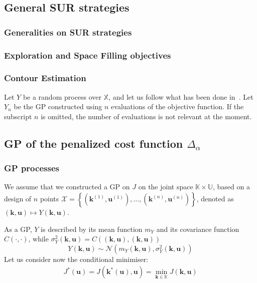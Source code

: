 \documentclass[a4paper,11pt]{article}
\newcommand{\Kspace}{\mathbb{K}}
\newcommand{\Uspace}{\mathbb{U}}
\newcommand{\Xspace}{\mathbb{X}}
\newcommand{\kk}{\mathbf{k}}
\newcommand{\uu}{\mathbf{u}}
\theoremstyle{defi}
\numberwithin{thmCounter}{section}
\begin{document}
\subsection{General SUR strategies}
\label{sec:SUR_strat}
\subsubsection{Generalities on SUR strategies}

\subsubsection{Exploration and Space Filling objectives}

\subsubsection{Contour Estimation}
Let $Y$ be a random process over $\Xspace$, and let us follow what has been done in~\cite{bect_sequential_2012}.
Let $Y_n$ be the GP constructed using $n$ evaluations of the objective function. If the subscript $n$ is omitted, the number of evaluations is not relevant at the moment.
\subsection{GP of the penalized cost function $\Delta_{\alpha}$}
\subsubsection{GP processes}
We assume that we constructed a GP on $J$ on the joint space $\Kspace \times \Uspace$, based on a design of $n$ points $\mathcal{X} = \left\{(\kk^{(1)},\uu^{(1)}),\dots,(\kk^{(n)},\uu^{(n)}) \right\}$, denoted as $(\kk,\uu)\mapsto Y(\kk,\uu)$.

As a GP, $Y$ is described by its mean function $m_{Y}$ and its covariance function $C(\cdot, \cdot)$, while $\sigma^2_Y(\kk,\uu) = C((\kk,\uu), (\kk,\uu))$
\begin{equation}
  Y(\kk,\uu) \sim \mathcal{N}\left(m_{Y}(\kk,\uu), \sigma^2_Y(\kk,\uu) \right)
\end{equation}
Let us consider now the conditional minimiser:
\begin{align}
  J^*(\uu) = J(\kk^*(\uu),\uu) = \min_{\kk\in\Kspace} J(\kk,\uu)
\end{align}
\end{document}
